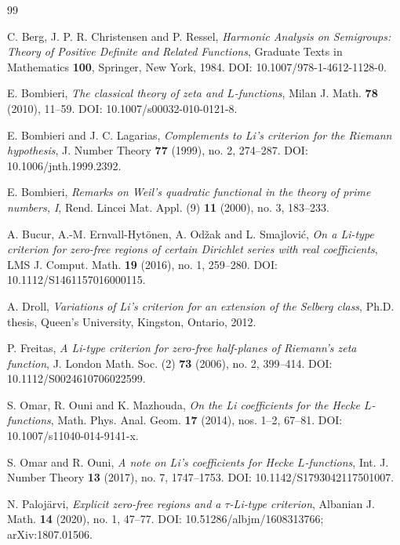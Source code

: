 \documentclass[11pt]{amsart}
\numberwithin{equation}{section}
\theoremstyle{plain}
\theoremstyle{definition}
\theoremstyle{remark}
\begin{document}
\begin{thebibliography}{99}

C. Berg, J. P. R. Christensen and P. Ressel,
\emph{Harmonic Analysis on Semigroups: Theory of Positive Definite and Related Functions},
Graduate Texts in Mathematics \textbf{100}, Springer, New York, 1984.
DOI: 10.1007/978-1-4612-1128-0.

E. Bombieri,
\emph{The classical theory of zeta and $L$-functions},
Milan J. Math. \textbf{78} (2010), 11--59.
DOI: 10.1007/s00032-010-0121-8.

E. Bombieri and J. C. Lagarias,
\emph{Complements to Li's criterion for the Riemann hypothesis},
J. Number Theory \textbf{77} (1999), no. 2, 274--287.
DOI: 10.1006/jnth.1999.2392.


E. Bombieri,
\emph{Remarks on Weil's quadratic functional in the theory of prime numbers, I},
Rend. Lincei Mat. Appl. (9) \textbf{11} (2000), no. 3, 183--233.


A. Bucur, A.-M. Ernvall-Hyt\"onen, A. Od\v{z}ak and L. Smajlovi\'c,
\emph{On a Li-type criterion for zero-free regions of certain Dirichlet series with real coefficients},
LMS J. Comput. Math. \textbf{19} (2016), no. 1, 259--280.
DOI: 10.1112/S1461157016000115.

A. Droll,
\emph{Variations of Li's criterion for an extension of the Selberg class},
Ph.D. thesis, Queen's University, Kingston, Ontario, 2012.

P. Freitas,
\emph{A Li-type criterion for zero-free half-planes of Riemann's zeta function},
J. London Math. Soc. (2) \textbf{73} (2006), no. 2, 399--414.
DOI: 10.1112/S0024610706022599.

S. Omar, R. Ouni and K. Mazhouda,
\emph{On the Li coefficients for the Hecke $L$-functions},
Math. Phys. Anal. Geom. \textbf{17} (2014), nos. 1--2, 67--81.
DOI: 10.1007/s11040-014-9141-x.

S. Omar and R. Ouni,
\emph{A note on Li's coefficients for Hecke $L$-functions},
Int. J. Number Theory \textbf{13} (2017), no. 7, 1747--1753.
DOI: 10.1142/S1793042117501007.

N. Paloj\"arvi,
\emph{Explicit zero-free regions and a $\tau$-Li-type criterion},
Albanian J. Math. \textbf{14} (2020), no. 1, 47--77.
DOI: 10.51286/albjm/1608313766; arXiv:1807.01506.


\end{thebibliography}
\end{document}
